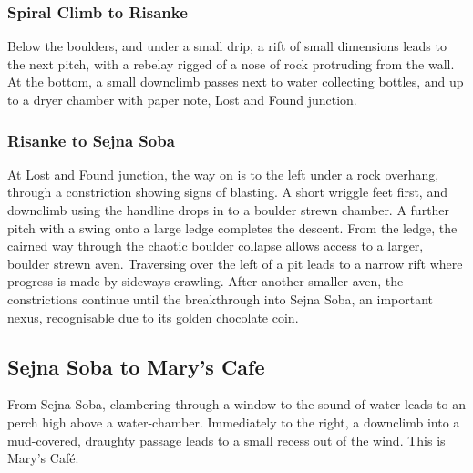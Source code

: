 \hypertarget{spiral-climb-to-risanke}{%
\subsubsection{Spiral Climb to Risanke}\label{spiral-climb-to-risanke}}

Below the boulders, and under a small drip, a rift of small dimensions leads to the next pitch, with a rebelay rigged of a nose of rock protruding from the wall. At the bottom, a small downclimb passes next to water collecting bottles, and up to a dryer chamber with paper note, Lost and Found junction.

\hypertarget{risanke-to-sejna-soba}{%
\subsubsection{Risanke to Sejna Soba}\label{risanke-to-sejna-soba}}

At Lost and Found junction, the way on is to the left under a rock overhang, through a constriction showing signs of blasting. A short wriggle feet first, and downclimb using the handline drops in to a boulder strewn chamber. A further pitch with a swing onto a large ledge completes the descent. From the ledge, the cairned way through the chaotic boulder collapse allows access to a larger, boulder strewn aven. Traversing over the left of a pit leads to a narrow rift where progress is made by sideways crawling. After another smaller aven, the constrictions continue until the breakthrough into Sejna Soba, an important nexus, recognisable due to its golden chocolate coin.

\hypertarget{sejna-soba-to-marys-cafe}{%
\subsection{Sejna Soba to Mary's Cafe}\label{sejna-soba-to-marys-cafe}}

From Sejna Soba, clambering through a window to the sound of water leads to an perch high above a water-chamber. Immediately to the right, a downclimb into a mud-covered, draughty passage leads to a small recess out of the wind. This is Mary's Café.

